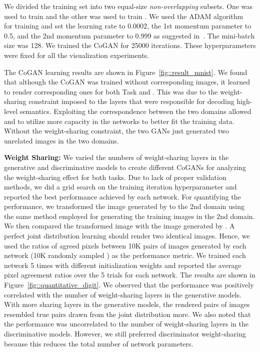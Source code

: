 \documentclass{article}
\begin{document}
We divided the training set into two equal-size {\it non-overlapping} subsets. One was used to train  and the other was used to train . We used the ADAM algorithm~\cite{kingma2014adam} for training and set the learning rate to 0.0002, the 1st momentum parameter to 0.5, and the 2nd momentum parameter to 0.999 as suggested in~\cite{radford2015unsupervised}. The mini-batch size was 128. We trained the CoGAN for 25000 iterations. These hyperparameters were fixed for all the visualization experiments. 

The CoGAN learning results are shown in Figure~\ref{fig::result_mnist}. We found that although the CoGAN was trained without corresponding images, it learned to render corresponding ones for both Task  and . This was due to the weight-sharing constraint imposed to the layers that were responsible for decoding high-level semantics. Exploiting the correspondence between the two domains allowed  and  to utilize more capacity in the networks to better fit the training data. Without the weight-sharing constraint, the two GANs just generated two unrelated images in the two domains.

{\bf Weight Sharing:} We varied the numbers of weight-sharing layers in the generative and discriminative models to create different CoGANs for analyzing the weight-sharing effect for both tasks. Due to lack of proper validation methods, we did a grid search on the training iteration hyperparameter and reported the best performance achieved by each network. For quantifying the performance, we transformed the image generated by  to the 2nd domain using the same method employed for generating the training images in the 2nd domain. We then compared the transformed image with the image generated by . A perfect joint distribution learning should render two identical images. Hence, we used the ratios of agreed pixels between 10K pairs of images generated by each network (10K randomly sampled ) as the performance metric. We trained each network 5 times with different initialization weights and reported the average pixel agreement ratios over the 5 trials for each network. The results are shown in Figure~\ref{fig::quantitative_digit}. We observed that the performance was positively correlated with the number of weight-sharing layers in the generative models. With more sharing layers in the generative models, the rendered pairs of images resembled true pairs drawn from the joint distribution more. We also noted that the performance was uncorrelated to the number of weight-sharing layers in the discriminative models. However, we still preferred discriminator weight-sharing because this reduces the total number of network parameters.
\end{document}

